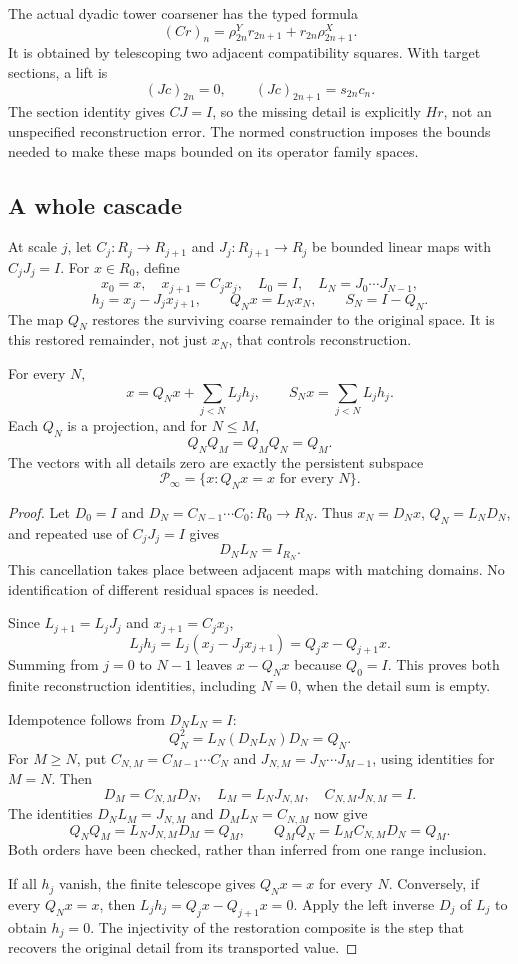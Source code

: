 The actual dyadic tower coarsener has the typed formula
\begin{equation}\label{KS:eq:dyadic}
 (Cr)_n=\rho^Y_{2n}r_{2n+1}+r_{2n}\rho^X_{2n+1}.
\end{equation}
It is obtained by telescoping two adjacent compatibility squares. With target sections, a lift is
\[
 (Jc)_{2n}=0,\qquad (Jc)_{2n+1}=s_{2n}c_n.
\]
The section identity gives \(CJ=I\), so the missing detail is explicitly \(Hr\), not an unspecified reconstruction error. The normed construction imposes the bounds needed to make these maps bounded on its operator family spaces.

\subsection{A whole cascade}
At scale \(j\), let \(C_j:R_j\to R_{j+1}\) and \(J_j:R_{j+1}\to R_j\) be bounded linear maps with \(C_jJ_j=I\). For \(x\in R_0\), define
\[
 x_0=x,\quad x_{j+1}=C_jx_j,\quad
 L_0=I,\quad L_N=J_0\cdots J_{N-1},
\]
\[
 h_j=x_j-J_jx_{j+1},\qquad Q_Nx=L_Nx_N,
 \qquad S_N=I-Q_N.
\]
The map \(Q_N\) restores the surviving coarse remainder to the original space. It is this restored remainder, not just \(x_N\), that controls reconstruction.

\begin{KStheorem}\label{KS:KS26}
For every \(N\),
\[
 x=Q_Nx+\sum_{j<N}L_jh_j,
 \qquad S_Nx=\sum_{j<N}L_jh_j.
\]
Each \(Q_N\) is a projection, and for \(N\le M\),
\[
 Q_NQ_M=Q_MQ_N=Q_M.
\]
The vectors with all details zero are exactly the persistent subspace
\[
 \mathcal P_\infty=\{x:Q_Nx=x\text{ for every }N\}.
\]
\end{KStheorem}
\begin{proof}
Let $D_0=I$ and $D_N=C_{N-1}\cdots C_0:R_0\to R_N$. Thus $x_N=D_Nx$, $Q_N=L_ND_N$, and repeated use of $C_jJ_j=I$ gives
\[
 D_NL_N=I_{R_N}.
\]
This cancellation takes place between adjacent maps with matching domains. No identification of different residual spaces is needed.

Since $L_{j+1}=L_jJ_j$ and $x_{j+1}=C_jx_j$,
\[
 L_jh_j=L_j(x_j-J_jx_{j+1})=Q_jx-Q_{j+1}x.
\]
Summing from $j=0$ to $N-1$ leaves $x-Q_Nx$ because $Q_0=I$. This proves both finite reconstruction identities, including $N=0$, when the detail sum is empty.

Idempotence follows from $D_NL_N=I$:
\[
 Q_N^2=L_N(D_NL_N)D_N=Q_N.
\]
For $M\ge N$, put $C_{N,M}=C_{M-1}\cdots C_N$ and $J_{N,M}=J_N\cdots J_{M-1}$, using identities for $M=N$. Then
\[
 D_M=C_{N,M}D_N,\quad L_M=L_NJ_{N,M},\quad C_{N,M}J_{N,M}=I.
\]
The identities $D_NL_M=J_{N,M}$ and $D_ML_N=C_{N,M}$ now give
\[
 Q_NQ_M=L_NJ_{N,M}D_M=Q_M,\qquad
 Q_MQ_N=L_MC_{N,M}D_N=Q_M.
\]
Both orders have been checked, rather than inferred from one range inclusion.

If all $h_j$ vanish, the finite telescope gives $Q_Nx=x$ for every $N$. Conversely, if every $Q_Nx=x$, then $L_jh_j=Q_jx-Q_{j+1}x=0$. Apply the left inverse $D_j$ of $L_j$ to obtain $h_j=0$. The injectivity of the restoration composite is the step that recovers the original detail from its transported value.
\end{proof}

